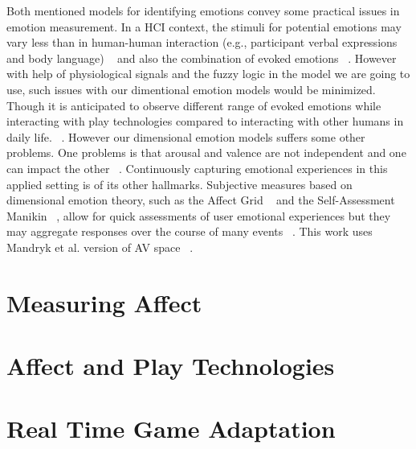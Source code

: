 Both mentioned models for identifying emotions convey some practical issues in emotion measurement. In a HCI context, the stimuli for potential emotions may vary less than in human-human interaction (e.g., participant verbal expressions and body language) ~\cite{zhang2010service} and also the combination of evoked emotions ~\cite{peter2006emotion}. However with help of physiological signals and the fuzzy logic in the model we are going to use, such issues with our dimentional emotion models would be minimized. Though it is anticipated to observe different range of evoked emotions while interacting with play technologies compared to interacting with other humans in daily life. ~\cite{zhang2010service}. However our dimensional emotion models suffers some other problems. One problems is that arousal and valence are not independent and one can impact the other ~\cite{mandryk2007fuzzy}. Continuously capturing emotional experiences in this applied setting is of its other hallmarks. Subjective measures based on dimensional emotion theory, such as the Affect Grid ~\cite{russell1989affect} and the Self-Assessment Manikin ~\cite{bradley1994measuring}, allow for quick assessments of user emotional experiences but they may aggregate responses over the course of many events ~\cite{zhang2010service}. This work uses Mandryk et al. version of AV space ~\cite{mandryk2007fuzzy}.


\section{Measuring Affect}


\section{Affect and Play Technologies}


\section{Real Time Game Adaptation}


